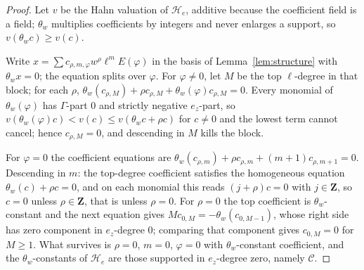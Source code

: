 \documentclass[11pt]{article}
\theoremstyle{definition}
\theoremstyle{remark}
\newcommand{\Z}{\mathbf Z}
\begin{document}
\begin{proof}
Let $v$ be the Hahn valuation of $\mathcal H_e$, additive because the
coefficient field is a field; $\theta_w$ multiplies coefficients by integers and
never enlarges a support, so $v(\theta_wc)\ge v(c)$.

Write $x=\sum c_{\rho,m,\varphi}w^\rho\ell^mE(\varphi)$ in the basis of
Lemma~\ref{lem:structure} with $\theta_wx=0$; the equation splits over
$\varphi$. For $\varphi\ne0$, let $M$ be the top $\ell$-degree in that block;
for each $\rho$,
$\theta_w(c_{\rho,M})+\rho c_{\rho,M}+\theta_w(\varphi)c_{\rho,M}=0$. Every
monomial of $\theta_w(\varphi)$ has $\Gamma$-part $0$ and strictly negative
$e_z$-part, so $v(\theta_w(\varphi)c)<v(c)\le v(\theta_wc+\rho c)$ for $c\ne0$
and the lowest term cannot cancel; hence $c_{\rho,M}=0$, and descending in $M$
kills the block.

For $\varphi=0$ the coefficient equations are
$\theta_w(c_{\rho,m})+\rho c_{\rho,m}+(m+1)c_{\rho,m+1}=0$. Descending in $m$:
the top-degree coefficient satisfies the homogeneous equation
$\theta_w(c)+\rho c=0$, and on each monomial this reads $(j+\rho)c=0$ with
$j\in\Z$, so $c=0$ unless $\rho\in\Z$, that is unless $\rho=0$. For $\rho=0$ the
top coefficient is $\theta_w$-constant and the next equation gives
$Mc_{0,M}=-\theta_w(c_{0,M-1})$, whose right side has zero component in
$e_z$-degree $0$; comparing that component gives $c_{0,M}=0$ for $M\ge1$. What
survives is $\rho=0$, $m=0$, $\varphi=0$ with $\theta_w$-constant coefficient,
and the $\theta_w$-constants of $\mathcal H_e$ are those supported in
$e_z$-degree zero, namely $\mathcal C$.
\end{proof}
\end{document}
